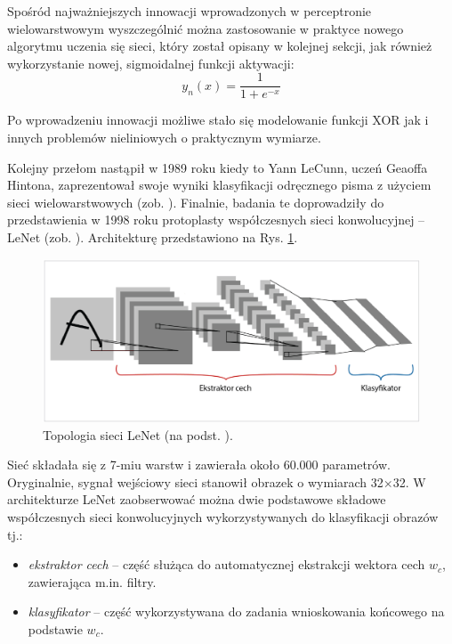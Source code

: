 Spośród najważniejszych innowacji wprowadzonych w perceptronie wielowarstwowym wyszczególnić można zastosowanie w praktyce nowego algorytmu uczenia się sieci, który został opisany w kolejnej sekcji, jak również wykorzystanie nowej, sigmoidalnej funkcji aktywacji:
\begin{equation}
\label{eqSigActFunc}
y_n(x) = \frac{1}{1 + e^{-x}}
\end{equation}

Po wprowadzeniu innowacji możliwe stało się modelowanie funkcji XOR jak \linebreak i innych problemów nieliniowych o praktycznym wymiarze. 

Kolejny przełom nastąpił w 1989 roku kiedy to Yann LeCunn, uczeń Geaoffa Hintona, zaprezentował swoje wyniki klasyfikacji odręcznego pisma z użyciem sieci wielowarstwowych (zob. \cite{NIPS1989_293}). Finalnie, badania te doprowadziły do przedstawienia w 1998 roku protoplasty współczesnych sieci konwolucyjnej -- LeNet (zob. \cite{Lecun1998}). Architekturę przedstawiono na Rys. \ref{LeNet}.
\begin{figure}[h!]
	\centering
	\includegraphics[width=1\textwidth]{figures/lenet.png}
	\caption{Topologia sieci LeNet (na podst. \cite{Lecun1998}).}
	\label{LeNet}
\end{figure}

Sieć składała się z 7-miu warstw i zawierała około 60.000 parametrów. Oryginalnie, sygnał wejściowy sieci stanowił obrazek o wymiarach 32$\times$32. W architekturze LeNet zaobserwować można dwie podstawowe składowe współczesnych sieci konwolucyjnych wykorzystywanych do klasyfikacji obrazów tj.:
\begin{itemize}[noitemsep,nolistsep]
	\item \textit{ekstraktor cech} -- część służąca do automatycznej ekstrakcji wektora cech \linebreak $w_c$, zawierająca m.in. filtry.
	\item \textit{klasyfikator} -- część wykorzystywana do zadania wnioskowania końcowego \linebreak na podstawie $w_c$.
\end{itemize}  

